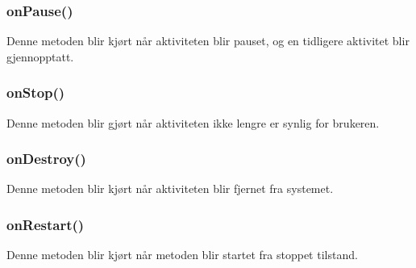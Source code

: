 \documentclass[a4paper, 12pt]{article}
\begin{document}
\subsubsection*{onPause()}
Denne metoden blir kjørt når aktiviteten blir pauset, og en tidligere aktivitet blir gjennopptatt.

\subsubsection*{onStop()}
Denne metoden blir gjørt når aktiviteten ikke lengre er synlig for brukeren.

\subsubsection*{onDestroy()}
Denne metoden blir kjørt når aktiviteten blir fjernet fra systemet.


\subsubsection*{onRestart()}
Denne metoden blir kjørt når metoden blir startet fra stoppet tilstand.
\end{document}
